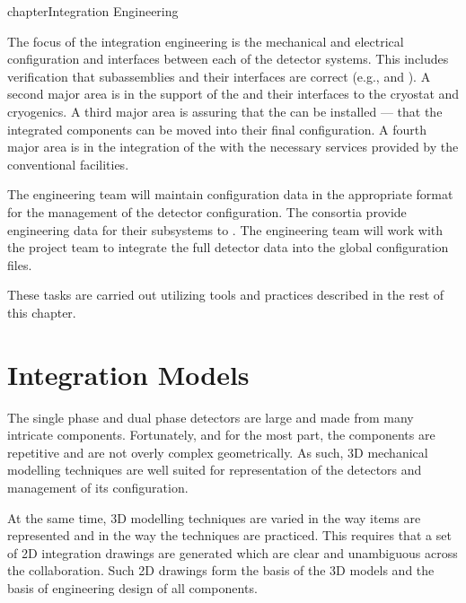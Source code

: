 chapter{Integration Engineering}
\label{sec:fdsp-coord-integ-sysengr}


The focus of the integration engineering is the mechanical and
electrical configuration and interfaces between each of the detector
systems. This includes verification that subassemblies and their
interfaces are correct (e.g.,  and \single {}). A
second major area is in the support of the  and
their interfaces to the cryostat and cryogenics. A third major area is
assuring that the  can be installed --- that the
integrated components can be moved into their final configuration. A
fourth major area is in the integration of the  with
the necessary services provided by the conventional facilities.


The  engineering team will maintain configuration data in
the appropriate format for the management of the detector
configuration. The consortia provide engineering data for their
subsystems to . The  engineering team will work
with the  project team to integrate the full detector data
into the global  configuration files.

These tasks are carried out utilizing tools and practices
described in the rest of this chapter.

\section{Integration Models}
\label{sec:fdsp-coord-integ-models}
The single phase and dual phase detectors are large and made from many
intricate components. Fortunately, and for the most part, the
components are repetitive and are not overly complex geometrically. As
such, 3D mechanical modelling techniques are well suited for
representation of the detectors and management of its configuration.


At the same time, 3D modelling techniques are varied in the way items
are represented and in the way the techniques are practiced. This
requires that a set of 2D integration drawings are generated which are
clear and unambiguous across the collaboration. Such 2D drawings form
the basis of the 3D models and the basis of engineering design of all
components.

